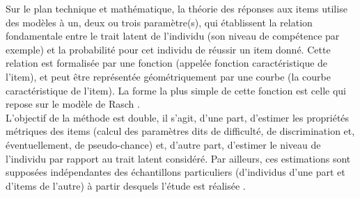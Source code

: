 Sur le plan technique et mathématique, la théorie des réponses aux items utilise des modèles à un, deux ou trois paramètre(s), qui établissent la relation fondamentale entre le trait latent de l'individu (son niveau de compétence par exemple) et la probabilité pour cet individu de réussir un item donné. Cette relation est formalisée par une fonction (appelée fonction caractéristique de l'item), et peut être représentée géométriquement par une courbe (la courbe caractéristique de l'item). La forme la plus simple de cette fonction est celle qui repose sur le modèle de Rasch \cite{xcv_wiki}.\\
L'objectif de la méthode est double, il s'agit, d'une part, d'estimer les propriétés métriques des items (calcul des paramètres dits de difficulté, de discrimination et, éventuellement, de pseudo-chance) et, d'autre part, d'estimer le niveau de l'individu par rapport au trait latent considéré. Par ailleurs, ces estimations sont supposées indépendantes des échantillons particuliers (d'individus d'une part et d'items de l'autre) à partir desquels l'étude est réalisée \cite{xcv_wiki}.
